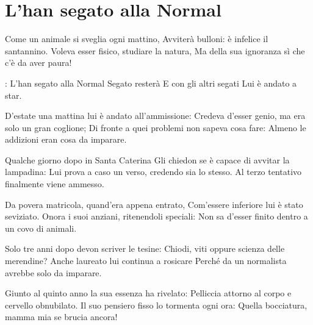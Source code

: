 \section{L’han segato alla Normal}
\subtitle{Sulla melodia di “Whiskey in the Jar” dei Dubliners}
\begin{canzone}
Come un animale si sveglia ogni mattino,
Avviterà bulloni: è infelice il santannino.
Voleva esser fisico, studiare la natura,
Ma della sua ignoranza sì che c’è da aver paura!

\ARIT: L’han segato alla Normal
\aritskip Segato resterà
\aritskip E con gli altri segati
\aritskip Lui è andato a star.

D’estate una mattina lui è andato all’ammissione:
Credeva d’esser genio, ma era solo un gran coglione;
Di fronte a quei problemi non sapeva cosa fare:
Almeno le addizioni eran cosa da imparare.

\RIT

Qualche giorno dopo in Santa Caterina
Gli chiedon se è capace di avvitar la lampadina:
Lui prova a caso un verso, credendo sia lo stesso.
Al terzo tentativo finalmente viene ammesso.

\RIT

Da povera matricola, quand’era appena entrato,
Com’essere inferiore lui è stato seviziato.
Onora i suoi anziani, ritenendoli speciali:
Non sa d’esser finito dentro a un covo di animali.

\RIT

Solo tre anni dopo devon scriver le tesine:
Chiodi, viti oppure scienza delle merendine?
Anche laureato lui continua a rosicare
Perché da un normalista avrebbe solo da imparare.

\RIT

Giunto al quinto anno la sua essenza ha rivelato:
Pelliccia attorno al corpo e cervello obnubilato.
Il suo pensiero fisso lo tormenta ogni ora:
Quella bocciatura, mamma mia se brucia ancora!

\RITB
\end{canzone}
